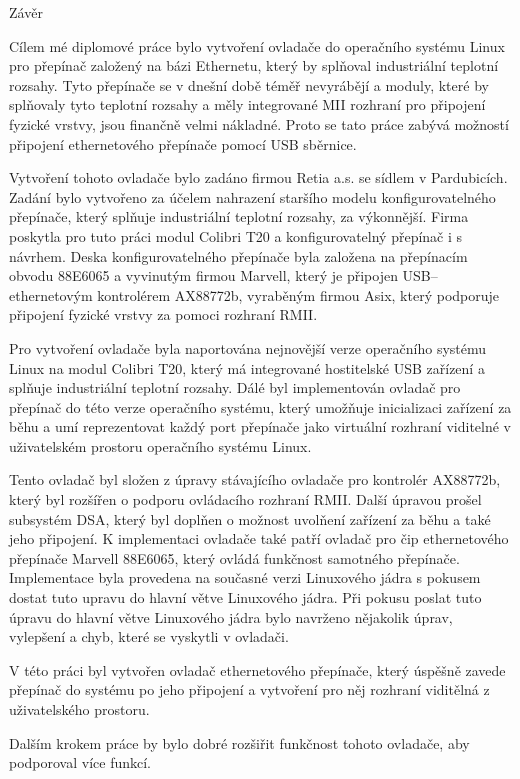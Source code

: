 
\chap Závěr

Cílem mé diplomové práce bylo vytvoření ovladače do operačního systému Linux pro přepínač založený na bázi Ethernetu, který by splňoval industriální teplotní rozsahy.
Tyto přepínače se v dnešní době téměř nevyrábějí a moduly, které by splňovaly tyto teplotní rozsahy a měly integrované MII rozhraní pro připojení fyzické vrstvy, jsou finančně velmi nákladné.
Proto se tato práce zabývá možností připojení ethernetového přepínače pomocí USB sběrnice.

Vytvoření tohoto ovladače bylo zadáno firmou Retia a.s. se sídlem v Pardubicích.
Zadání bylo vytvořeno za účelem nahrazení staršího modelu konfigurovatelného přepínače, který splňuje industriální teplotní rozsahy, za výkonnější.
Firma poskytla pro tuto práci modul Colibri T20 a konfigurovatelný přepínač i s návrhem.
Deska konfigurovatelného přepínače byla založena na přepínacím obvodu 88E6065 a vyvinutým firmou Marvell, který je připojen USB--ethernetovým kontrolérem AX88772b, vyraběným firmou Asix, který podporuje připojení fyzické vrstvy za pomoci rozhraní RMII.

Pro vytvoření ovladače byla naportována nejnovější verze operačního systému Linux na modul Colibri T20, který má integrované hostitelské USB zařízení a splňuje industriální teplotní rozsahy.
Dálé byl implementován ovladač pro přepínač do této verze operačního systému, který umožňuje inicializaci zařízení za běhu a umí reprezentovat každý port přepínače jako virtuální rozhraní viditelné v uživatelském prostoru operačního systému Linux.

Tento ovladač byl složen z úpravy stávajícího ovladače pro kontrolér AX88772b, který byl rozšířen o podporu ovládacího rozhraní RMII.
Další úpravou prošel subsystém DSA, který byl doplňen o možnost uvolňení zařízení za běhu a také jeho připojení.
K implementaci ovladače také patří ovladač pro čip ethernetového přepínače Marvell 88E6065, který ovládá funkčnost samotného přepínače.
Implementace byla provedena na současné verzi Linuxového jádra s pokusem dostat tuto upravu do hlavní větve Linuxového jádra.
Při pokusu poslat tuto úpravu do hlavní větve Linuxového jádra bylo navrženo nějakolik úprav, vylepšení a chyb, které se vyskytli v ovladači.

V této práci byl vytvořen ovladač ethernetového přepínače, který úspěšně zavede přepínač do systému po jeho připojení a vytvoření pro něj rozhraní viditělná z uživatelského prostoru.

Dalším krokem práce by bylo dobré rozšiřit funkčnost tohoto ovladače, aby podporoval více funkcí.




